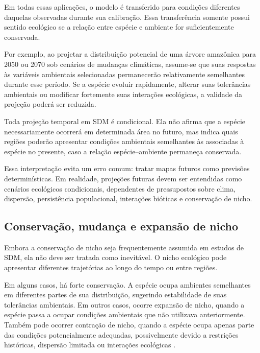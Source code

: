 Em todas essas aplicações, o modelo é transferido para condições diferentes daquelas observadas durante sua calibração. Essa transferência somente possui sentido ecológico se a relação entre espécie e ambiente for suficientemente conservada.

Por exemplo, ao projetar a distribuição potencial de uma árvore amazônica para 2050 ou 2070 sob cenários de mudanças climáticas, assume-se que suas respostas às variáveis ambientais selecionadas permanecerão relativamente semelhantes durante esse período. Se a espécie evoluir rapidamente, alterar suas tolerâncias ambientais ou modificar fortemente suas interações ecológicas, a validade da projeção poderá ser reduzida.

\begin{atencao}
	Toda projeção temporal em SDM é condicional. Ela não afirma que a espécie necessariamente ocorrerá em determinada área no futuro, mas indica quais regiões poderão apresentar condições ambientais semelhantes às associadas à espécie no presente, caso a relação espécie--ambiente permaneça conservada.
\end{atencao}

Essa interpretação evita um erro comum: tratar mapas futuros como previsões determinísticas. Em realidade, projeções futuras devem ser entendidas como cenários ecológicos condicionais, dependentes de pressupostos sobre clima, dispersão, persistência populacional, interações bióticas e conservação de nicho.

\subsection{Conservação, mudança e expansão de nicho}

Embora a conservação de nicho seja frequentemente assumida em estudos de SDM, ela não deve ser tratada como inevitável. O nicho ecológico pode apresentar diferentes trajetórias ao longo do tempo ou entre regiões.

Em alguns casos, há forte conservação. A espécie ocupa ambientes semelhantes em diferentes partes de sua distribuição, sugerindo estabilidade de suas tolerâncias ambientais. Em outros casos, ocorre expansão de nicho, quando a espécie passa a ocupar condições ambientais que não utilizava anteriormente. Também pode ocorrer contração de nicho, quando a espécie ocupa apenas parte das condições potencialmente adequadas, possivelmente devido a restrições históricas, dispersão limitada ou interações ecológicas \parencite{broennimann2007,guisan2014}.

